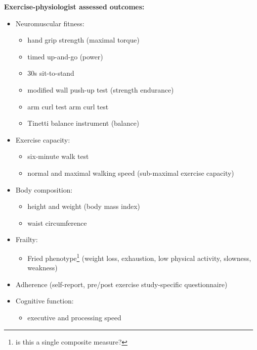 \documentclass[
]{article}
\begin{document}
\textbf{Exercise-physiologist assessed outcomes:}
\begin{itemize}
    \item Neuromuscular fitness:
    \begin{itemize}
    \item hand grip strength (maximal torque)
    \item timed up-and-go (power)
    \item 30s sit-to-stand
    \item modified wall push-up test (strength endurance)
    \item arm curl test arm curl test
    \item Tinetti balance instrument (balance)
    \end{itemize}

    \item Exercise capacity:
    \begin{itemize}
        \item six-minute walk test
        \item normal and maximal walking speed (sub-maximal exercise capacity)
    \end{itemize}

    \item Body composition:
    \begin{itemize}
        \item height and weight (body mass index)
        \item waist circumference
    \end{itemize}

    \item Frailty:
    \begin{itemize}
        \item Fried phenotype\footnote{is this a single composite measure?} (weight loss, exhaustion, low physical activity, slowness, weakness)
    \end{itemize}

    \item Adherence (self-report, pre/post exercise study-specific questionnaire)

    \item Cognitive function:
    \begin{itemize}
        \item executive and processing speed
    \end{itemize}

\end{itemize}
\end{document}
